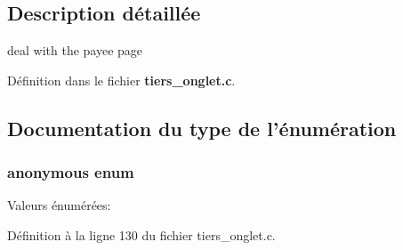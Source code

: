 \subsection{Description détaillée}
deal with the payee page 

Définition dans le fichier {\bf tiers\_\-onglet.c}.



\subsection{Documentation du type de l'énumération}
\subsubsection[{"@11}]{\setlength{\rightskip}{0pt plus 5cm}anonymous enum}\label{tiers__onglet_8c_abc5c98fcc1211af2b80116dd6e0a035d}
\begin{Desc}
\item[Valeurs énumérées: ]\par
\begin{description}
\item[{\em 
COLUMN\_\-BOOLEAN\label{tiers__onglet_8c_abc5c98fcc1211af2b80116dd6e0a035da982886b778cf015f8d72c496ce4dedb6}
}]\item[{\em 
COLUMN\_\-INT\label{tiers__onglet_8c_abc5c98fcc1211af2b80116dd6e0a035daad6041d7dcff206e48713c27d5e75628}
}]\item[{\em 
COLUMN\_\-STRING\label{tiers__onglet_8c_abc5c98fcc1211af2b80116dd6e0a035da82ce7c336b8fb83f07086d96341923cd}
}]\item[{\em 
N\_\-COLUMNS\label{tiers__onglet_8c_abc5c98fcc1211af2b80116dd6e0a035dac70d28409ca79aa291cc0e58244f1fe4}
}]\end{description}
\end{Desc}



Définition à la ligne 130 du fichier tiers\_\-onglet.c.

